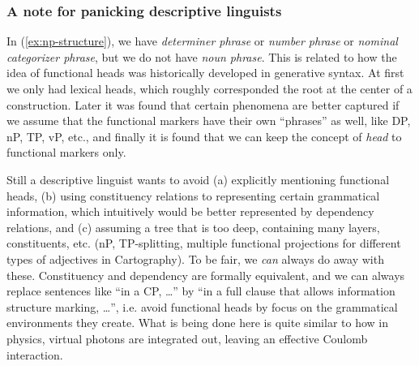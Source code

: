 \documentclass[a4paper, oneside, scheme=plain, 12pt]{article}
\newcommand*{\term}[1]{\emph{#1}}
\begin{document}
\subsubsection{A note for panicking descriptive linguists}\label{sec:remove-functional-heads}

In (\ref{ex:np-structure}), we have \term{determiner phrase} or \term{number phrase} or \term{nominal categorizer phrase},
but we do not have \term{noun phrase}.
This is related to how the idea of functional heads was historically developed in generative syntax.
At first we only had lexical heads, which roughly corresponded the root at the center of a construction.
Later it was found that certain phenomena are better captured
if we assume that the functional markers have their own ``phrases'' as well,
like DP, nP, TP, vP, etc.,
and finally it is found that we can keep the concept of \term{head} to functional markers only.

Still a descriptive linguist wants to avoid 
(a) explicitly mentioning functional heads,
(b) using constituency relations to representing certain grammatical information, which intuitively would be better represented by dependency relations, and 
(c) assuming a tree that is too deep, containing many layers, constituents, etc. (nP, TP-splitting, multiple functional projections for different types of adjectives in Cartography).
To be fair, we \emph{can} always do away with these.
Constituency and dependency are formally equivalent,
and we can always replace sentences like ``in a CP, \dots''
by ``in a full clause that allows information structure marking, \dots'',
i.e. avoid functional heads by focus on the grammatical environments they create.
What is being done here is quite similar to how in physics,
virtual photons are integrated out, leaving an effective Coulomb interaction.
\end{document}
